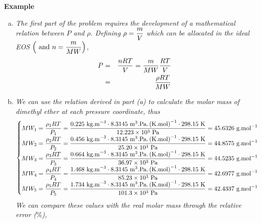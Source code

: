\begin{MyExample}{\begin{center}{\bf Example}\end{center}}
\begin{example}
       \begin{enumerate}[a)]
           \item {\it The first part of the problem requires the development of a mathematical relation between $P$ and $\rho$. Defining} $\rho=\displaystyle\frac{m}{V}$ {\it which can be allocated in the ideal EOS} $\left(\text{ and }n=\displaystyle\frac{m}{MW}\right)$,
              \begin{eqnarray}
                 P &=& \displaystyle\frac{n R T }{V} = \displaystyle\frac{m}{MW}\displaystyle\frac{R T}{V} \nonumber\\ 
                   &=& \displaystyle\frac{\rho R T}{MW}\nonumber
              \end{eqnarray}
%
           \item {\it We can use the relation derived in part (a) to calculate the molar mass of dimethyl ether at each pressure coordinate, thus}
              \begin{displaymath}
                  \begin{cases}
                     MW_{1} = \displaystyle\frac{\rho_{1} R T}{P_{1}} = \displaystyle\frac{0.225\text{ kg.m}^{-3}\cdot 8.3145\text{ m}^{3}\text{.Pa.}\left(\text{K.mol}\right)^{-1}\cdot 298.15\text{ K}}{12.223\times 10^{3}\text{ Pa}} = 45.6326 \text{ g.mol}^{-1} \\
                     MW_{2} = \displaystyle\frac{\rho_{2} R T}{P_{2}} = \displaystyle\frac{0.456\text{ kg.m}^{-3}\cdot 8.3145\text{ m}^{3}\text{.Pa.}\left(\text{K.mol}\right)^{-1}\cdot 298.15\text{ K}}{25.20\times 10^{3}\text{ Pa}} = 44.8575 \text{ g.mol}^{-1} \\
                     MW_{3} = \displaystyle\frac{\rho_{3} R T}{P_{3}} = \displaystyle\frac{0.664\text{ kg.m}^{-3}\cdot 8.3145\text{ m}^{3}\text{.Pa.}\left(\text{K.mol}\right)^{-1}\cdot 298.15\text{ K}}{36.97\times 10^{3}\text{ Pa}} = 44.5235 \text{ g.mol}^{-1} \\
                     MW_{4} = \displaystyle\frac{\rho_{4} R T}{P_{4}} = \displaystyle\frac{1.468\text{ kg.m}^{-3}\cdot 8.3145\text{ m}^{3}\text{.Pa.}\left(\text{K.mol}\right)^{-1}\cdot 298.15\text{ K}}{85.23\times 10^{3}\text{ Pa}} = 42.6977 \text{ g.mol}^{-1} \\
                     MW_{5} = \displaystyle\frac{\rho_{5} R T}{P_{5}} = \displaystyle\frac{1.734\text{ kg.m}^{-3}\cdot 8.3145\text{ m}^{3}\text{.Pa.}\left(\text{K.mol}\right)^{-1}\cdot 298.15\text{ K}}{101.3\times 10^{3}\text{ Pa}} = 42.4337 \text{ g.mol}^{-1} \\
                  \end{cases} 
              \end{displaymath}
              {\it We can compare these values with the real molar mass through the relative error ($\%$),}

\end{enumerate}
\end{example}
\end{MyExample}
